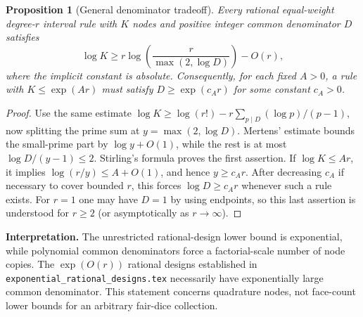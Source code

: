 \documentclass[11pt]{article}
\newtheorem{proposition}[theorem]{Proposition}
\begin{document}
\begin{proposition}[General denominator tradeoff]
Every rational equal-weight degree-$r$ interval rule with $K$ nodes and
positive integer common denominator $D$ satisfies
\[
 \log K\ge r\log\left(\frac{r}{\max(2,\log D)}\right)-O(r),
\]
where the implicit constant is absolute. Consequently, for each fixed
$A>0$, a rule with $K\le\exp(Ar)$ must satisfy
$D\ge\exp(c_A r)$ for some constant $c_A>0$.
\end{proposition}
\begin{proof}
Use the same estimate
$\log K\ge\log(r!)-r\sum_{p\mid D}(\log p)/(p-1)$,
now splitting the prime sum at $y=\max(2,\log D)$.
Mertens' estimate bounds the small-prime part by $\log y+O(1)$,
while the rest is at most $\log D/(y-1)\le2$.
Stirling's formula proves the first assertion. If $\log K\le Ar$, it
implies $\log(r/y)\le A+O(1)$, and hence $y\ge c_A r$.
After decreasing $c_A$ if necessary to cover bounded $r$, this forces
$\log D\ge c_A r$ whenever such a rule exists. For $r=1$ one may have
$D=1$ by using endpoints, so this last assertion is understood for
$r\ge2$ (or asymptotically as $r\to\infty$).
\end{proof}

\noindent\textbf{Interpretation.} The unrestricted rational-design lower
bound is exponential, while polynomial common denominators force a
factorial-scale number of node copies. The $\exp(O(r))$ rational designs established in
\texttt{exponential\_rational\_designs.tex} necessarily have exponentially
large common denominator. This
statement concerns quadrature nodes, not face-count lower bounds for an
arbitrary fair-dice collection.
\end{document}
